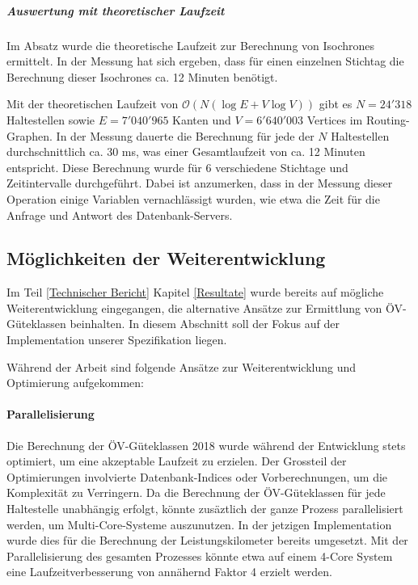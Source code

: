 \subparagraph{Auswertung mit theoretischer Laufzeit}
Im Absatz  wurde die theoretische Laufzeit zur Berechnung von \glspl{Isochrone} ermittelt.
In der Messung hat sich ergeben, dass für einen einzelnen Stichtag die Berechnung dieser \glspl{Isochrone} ca. 12 Minuten benötigt.

Mit der theoretischen Laufzeit von $\mathcal{O}(N (\log E + V \log V))$ gibt es $N = 24'318$ Haltestellen sowie $E = 7'040'965$ Kanten und $V = 6'640'003$ Vertices im Routing-Graphen.
In der Messung dauerte die Berechnung für jede der $N$ Haltestellen durchschnittlich ca. 30 ms, was einer Gesamtlaufzeit von ca. 12 Minuten entspricht.
Diese Berechnung wurde für 6 verschiedene Stichtage und Zeitintervalle durchgeführt.
Dabei ist anzumerken, dass in der Messung dieser Operation einige Variablen vernachlässigt wurden, wie etwa die Zeit für die Anfrage und Antwort des Datenbank-Servers.

\subsection{Möglichkeiten der Weiterentwicklung}
\label{Resultate und Weiterentwicklung:Möglichkeiten der Weiterentwicklung}

Im Teil \ref{Technischer Bericht} Kapitel \ref{Resultate} wurde bereits auf mögliche Weiterentwicklung eingegangen, die alternative Ansätze zur Ermittlung von \acs{ÖV}-Güteklassen beinhalten.
In diesem Abschnitt soll der Fokus auf der Implementation unserer Spezifikation liegen.

Während der Arbeit sind folgende Ansätze zur Weiterentwicklung und Optimierung aufgekommen:

\paragraph{Parallelisierung}
Die Berechnung der \acs{ÖV}-Güteklassen 2018 wurde während der Entwicklung stets optimiert, um eine akzeptable Laufzeit zu erzielen.
Der Grossteil der Optimierungen involvierte Datenbank-Indices oder Vorberechnungen, um die Komplexität zu Verringern.
Da die Berechnung der \acs{ÖV}-Güteklassen für jede Haltestelle unabhängig erfolgt, könnte zusäztlich der ganze Prozess parallelisiert werden, um Multi-Core-Systeme auszunutzen.
In der jetzigen Implementation wurde dies für die Berechnung der Leistungskilometer bereits umgesetzt.
Mit der Parallelisierung des gesamten Prozesses könnte etwa auf einem 4-Core System eine Laufzeitverbesserung von annähernd Faktor 4 erzielt werden.

